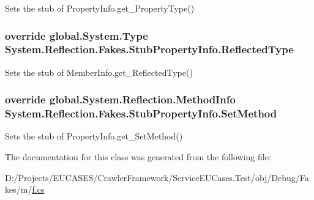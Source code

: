 Sets the stub of Property\-Info.\-get\-\_\-\-Property\-Type()

\hypertarget{class_system_1_1_reflection_1_1_fakes_1_1_stub_property_info_a0fb2e804b0dcf8435fbf1a1565493ba7}{
\subsubsection[{Reflected\-Type}]{\setlength{\rightskip}{0pt plus 5cm}override global.\-System.\-Type System.\-Reflection.\-Fakes.\-Stub\-Property\-Info.\-Reflected\-Type\hspace{0.3cm}{\ttfamily [get]}}}\label{class_system_1_1_reflection_1_1_fakes_1_1_stub_property_info_a0fb2e804b0dcf8435fbf1a1565493ba7}


Sets the stub of Member\-Info.\-get\-\_\-\-Reflected\-Type()

\hypertarget{class_system_1_1_reflection_1_1_fakes_1_1_stub_property_info_adf7f9676f2e2bc7170ac348652c7549a}{
\subsubsection[{Set\-Method}]{\setlength{\rightskip}{0pt plus 5cm}override global.\-System.\-Reflection.\-Method\-Info System.\-Reflection.\-Fakes.\-Stub\-Property\-Info.\-Set\-Method\hspace{0.3cm}{\ttfamily [get]}}}\label{class_system_1_1_reflection_1_1_fakes_1_1_stub_property_info_adf7f9676f2e2bc7170ac348652c7549a}


Sets the stub of Property\-Info.\-get\-\_\-\-Set\-Method()



The documentation for this class was generated from the following file\-:\begin{DoxyCompactItemize}
\item 
D\-:/\-Projects/\-E\-U\-C\-A\-S\-E\-S/\-Crawler\-Framework/\-Service\-E\-U\-Cases.\-Test/obj/\-Debug/\-Fakes/m/\hyperlink{m_2f_8cs}{f.\-cs}\end{DoxyCompactItemize}
